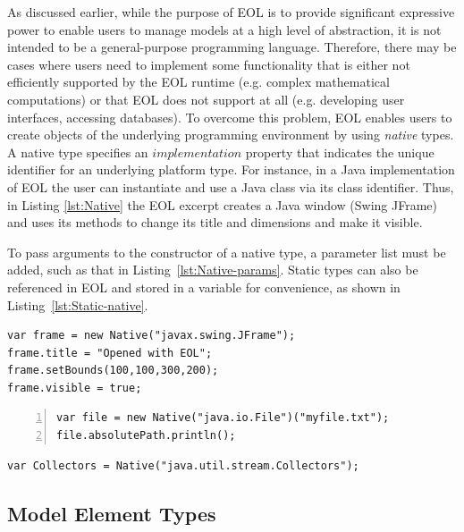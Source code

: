 As discussed earlier, while the purpose of EOL is to provide significant expressive power to enable users to manage models at a high level of abstraction, it is not intended to be a general-purpose programming language. Therefore, there may be cases where users need to implement some functionality that is either not efficiently supported by the EOL runtime (e.g. complex mathematical computations) or that EOL does not support at all (e.g. developing user interfaces, accessing databases). To overcome this problem, EOL enables users to create objects of the underlying programming environment by using \emph{native} types. A native type specifies an $implementation$ property that indicates the unique identifier for an underlying platform type. For instance, in a Java implementation of EOL the user can instantiate and use a Java class via its class identifier. Thus, in Listing \ref{lst:Native} the EOL excerpt creates a Java window (Swing JFrame) and uses its methods to change its title and dimensions and make it visible.

To pass arguments to the constructor of a native type, a parameter list must be added, such as that in Listing~\ref{lst:Native-params}.
Static types can also be referenced in EOL and stored in a variable for convenience, as shown in Listing~\ref{lst:Static-native}.

\begin{lstlisting}[float=h, caption=Demonstration of NativeType in EOL, label=lst:Native, language=EOL]
var frame = new Native("javax.swing.JFrame");
frame.title = "Opened with EOL";
frame.setBounds(100,100,300,200);
frame.visible = true;
\end{lstlisting}

\begin{lstlisting}[float=h, caption=Demonstration of NativeType in EOL, label=lst:Native-params, numbers=left, language=EOL]
var file = new Native("java.io.File")("myfile.txt");
file.absolutePath.println();
\end{lstlisting}

\begin{lstlisting}[float=h, caption=Demonstration of NativeType in EOL, label=lst:Static-native, language=EOL]
	var Collectors = Native("java.util.stream.Collectors");
\end{lstlisting}

\subsection{Model Element Types}

